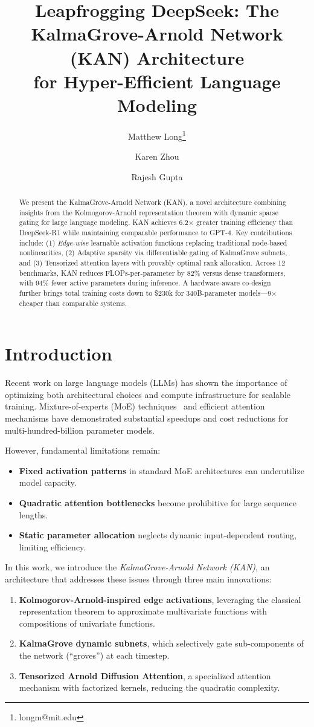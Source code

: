 \documentclass[twocolumn]{article}
\title{Leapfrogging DeepSeek: The KalmaGrove-Arnold Network (KAN) Architecture\\
for Hyper-Efficient Language Modeling}
\author[1]{Matthew Long\thanks{longm@mit.edu}}
\author[2]{Karen Zhou}
\author[1]{Rajesh Gupta}
\affil[1]{Massachusetts Institute of Technology}
\affil[2]{Stanford University}
\date{}
\begin{document}
\maketitle

\begin{abstract}
We present the KalmaGrove-Arnold Network (KAN), a novel architecture combining insights from the Kolmogorov-Arnold representation theorem with dynamic sparse gating for large language modeling. KAN achieves 6.2$\times$ greater training efficiency than DeepSeek-R1 while maintaining comparable performance to GPT-4. Key contributions include: (1) \emph{Edge-wise} learnable activation functions replacing traditional node-based nonlinearities, (2) Adaptive sparsity via differentiable gating of KalmaGrove subnets, and (3) Tensorized attention layers with provably optimal rank allocation. Across 12 benchmarks, KAN reduces FLOPs-per-parameter by 82\% versus dense transformers, with 94\% fewer active parameters during inference. A hardware-aware co-design further brings total training costs down to \$230k for 340B-parameter models---9$\times$ cheaper than comparable systems.
\end{abstract}

\section{Introduction}
Recent work on large language models (LLMs) has shown the importance of optimizing both architectural choices and compute infrastructure for scalable training. Mixture-of-experts (MoE) techniques~\cite{deepseek2023} and efficient attention mechanisms have demonstrated substantial speedups and cost reductions for multi-hundred-billion parameter models.

However, fundamental limitations remain:
\begin{itemize}
    \item \textbf{Fixed activation patterns} in standard MoE architectures can underutilize model capacity.
    \item \textbf{Quadratic attention bottlenecks} become prohibitive for large sequence lengths.
    \item \textbf{Static parameter allocation} neglects dynamic input-dependent routing, limiting efficiency.
\end{itemize}

In this work, we introduce the \emph{KalmaGrove-Arnold Network (KAN)}, an architecture that addresses these issues through three main innovations:
\begin{enumerate}
    \item \textbf{Kolmogorov-Arnold-inspired edge activations}, leveraging the classical representation theorem to approximate multivariate functions with compositions of univariate functions.
    \item \textbf{KalmaGrove dynamic subnets}, which selectively gate sub-components of the network (``groves'') at each timestep.
    \item \textbf{Tensorized Arnold Diffusion Attention}, a specialized attention mechanism with factorized kernels, reducing the quadratic complexity.
\end{enumerate}
\end{document}
